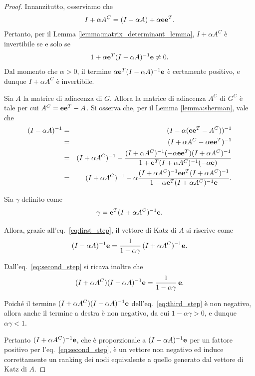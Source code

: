 \documentclass[a4paper]{article}
\newcommand{\evec}{{\bf e}}
\begin{document}
\begin{proof}
    Innanzitutto, osserviamo che
    \[ I+\alpha A^C = (I-\alpha A)+\alpha \evec \evec^T. \]
    Pertanto, per il Lemma \ref{lemma:matrix_determinant_lemma},
    $I + \alpha A^C$ è invertibile se e solo se
    \[ 1 + \alpha \evec^T (I - \alpha A)^{-1} \evec \neq 0. \]
    Dal momento che $\alpha > 0$, il termine $\alpha \evec^T (I - \alpha A)^{-1} \evec$ è certamente positivo, e dunque $I + \alpha A^C$ è invertibile.

    Sia $A$ la matrice di adiacenza di $G$. Allora la matrice di adiacenza
    $A^C$ di $G^C$ è tale per cui $A^C = \evec \evec^T - A$. Si osserva
    che, per il Lemma \ref{lemma:sherman}, vale che
    \begin{eqnarray}
        (I-\alpha A)^{-1}
        &=& (I - \alpha (\evec \evec^T - A^C))^{-1} \nonumber \\
        &=& (I+\alpha A^C-\alpha \evec \evec^T)^{-1} \nonumber \\
        &=& (I + \alpha A^C)^{-1} - \frac{(I + \alpha A^C)^{-1} (-\alpha \evec \evec^T) (I + \alpha A^C)^{-1}}{1 + \evec^T (I + \alpha A^C)^{-1} (-\alpha \evec)} \nonumber \\
        &=& (I + \alpha A^C)^{-1} + \alpha \frac{(I + \alpha A^C)^{-1} \evec \evec^T (I + \alpha A^C)^{-1}}{1 - \alpha \evec^T (I + \alpha A^C)^{-1} \evec}. \label{eq:first_step}
    \end{eqnarray}

    Sia $\gamma$ definito come
    \[
        \gamma = \evec^T (I + \alpha A^C)^{-1} \evec.
    \]

    Allora, grazie all'eq.~\eqref{eq:first_step}, il vettore di Katz di $A$ si riscrive come
    \begin{equation}
        \label{eq:second_step}
        (I-\alpha A)^{-1} \evec = \frac{1}{1 - \alpha \gamma} \, (I + \alpha A^C)^{-1} \evec.
    \end{equation}

    Dall'eq.~\eqref{eq:second_step} si ricava inoltre che
    \begin{equation} \label{eq:third_step}
        (I + \alpha A^C) (I-\alpha A)^{-1} \evec = \frac{1}{1 - \alpha \gamma} \, \evec.
    \end{equation}

    Poiché il termine $(I + \alpha A^C) (I-\alpha A)^{-1} \evec$ dell'eq.~\eqref{eq:third_step} è non negativo, allora
    anche il termine a destra è non negativo, da cui
    $1 - \alpha \gamma > 0$, e dunque $\alpha \gamma < 1$.

    Pertanto $(I + \alpha A^C)^{-1} \evec$, che è proporzionale a $(I-\alpha A)^{-1} \evec$ per un fattore positivo per
    l'eq.~\eqref{eq:second_step}, è un vettore non negativo ed induce correttamente un ranking dei nodi equivalente
    a quello generato dal vettore di Katz di $A$.
\end{proof}
\end{document}

